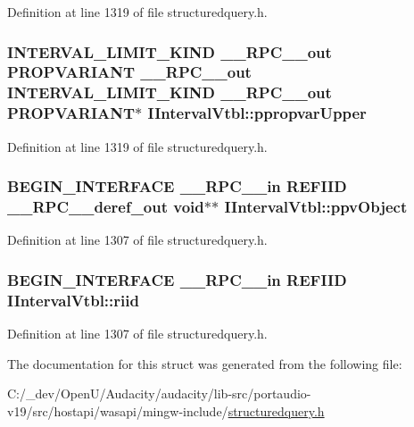 Definition at line 1319 of file structuredquery.\+h.

\subsubsection[{\texorpdfstring{ppropvar\+Upper}{ppropvarUpper}}]{ {\bf I\+N\+T\+E\+R\+V\+A\+L\+\_\+\+L\+I\+M\+I\+T\+\_\+\+K\+I\+ND} {\bf \+\_\+\+\_\+\+R\+P\+C\+\_\+\+\_\+out} {\bf P\+R\+O\+P\+V\+A\+R\+I\+A\+NT} {\bf \+\_\+\+\_\+\+R\+P\+C\+\_\+\+\_\+out} {\bf I\+N\+T\+E\+R\+V\+A\+L\+\_\+\+L\+I\+M\+I\+T\+\_\+\+K\+I\+ND} {\bf \+\_\+\+\_\+\+R\+P\+C\+\_\+\+\_\+out} {\bf P\+R\+O\+P\+V\+A\+R\+I\+A\+NT}$\ast$ I\+Interval\+Vtbl\+::ppropvar\+Upper}\hypertarget{struct_i_interval_vtbl_ae9f322ff0dd869ffb4d426969f04a789}{}\label{struct_i_interval_vtbl_ae9f322ff0dd869ffb4d426969f04a789}


Definition at line 1319 of file structuredquery.\+h.

\subsubsection[{\texorpdfstring{ppv\+Object}{ppvObject}}]{\setlength{\rightskip}{0pt plus 5cm}B\+E\+G\+I\+N\+\_\+\+I\+N\+T\+E\+R\+F\+A\+CE {\bf \+\_\+\+\_\+\+R\+P\+C\+\_\+\+\_\+in} {\bf R\+E\+F\+I\+ID} {\bf \+\_\+\+\_\+\+R\+P\+C\+\_\+\+\_\+deref\+\_\+out} {\bf void}$\ast$$\ast$ I\+Interval\+Vtbl\+::ppv\+Object}\hypertarget{struct_i_interval_vtbl_a2432190272c929f87bec2e06fa0475a5}{}\label{struct_i_interval_vtbl_a2432190272c929f87bec2e06fa0475a5}


Definition at line 1307 of file structuredquery.\+h.

\subsubsection[{\texorpdfstring{riid}{riid}}]{\setlength{\rightskip}{0pt plus 5cm}B\+E\+G\+I\+N\+\_\+\+I\+N\+T\+E\+R\+F\+A\+CE {\bf \+\_\+\+\_\+\+R\+P\+C\+\_\+\+\_\+in} {\bf R\+E\+F\+I\+ID} I\+Interval\+Vtbl\+::riid}\hypertarget{struct_i_interval_vtbl_a5093e97add4aa256c72f191a990ca814}{}\label{struct_i_interval_vtbl_a5093e97add4aa256c72f191a990ca814}


Definition at line 1307 of file structuredquery.\+h.



The documentation for this struct was generated from the following file\+:\begin{DoxyCompactItemize}
\item 
C\+:/\+\_\+dev/\+Open\+U/\+Audacity/audacity/lib-\/src/portaudio-\/v19/src/hostapi/wasapi/mingw-\/include/\hyperlink{structuredquery_8h}{structuredquery.\+h}\end{DoxyCompactItemize}
